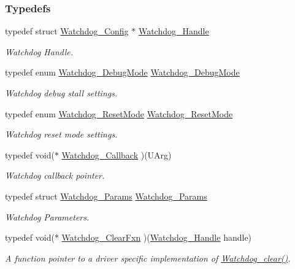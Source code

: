 \subsubsection*{Typedefs}
\begin{DoxyCompactItemize}
\item 
typedef struct \hyperlink{struct_watchdog___config}{Watchdog\-\_\-\-Config} $\ast$ \hyperlink{_watchdog_8h_a00ed22749c947ef200434eeec507f90d}{Watchdog\-\_\-\-Handle}
\begin{DoxyCompactList}\small\item\em Watchdog Handle. \end{DoxyCompactList}\item 
typedef enum \hyperlink{_watchdog_8h_ab1aa5862661c88a16b9d7bc12709d51e}{Watchdog\-\_\-\-Debug\-Mode} \hyperlink{_watchdog_8h_a369f0c40c3acb08f0ad21df99aedd42f}{Watchdog\-\_\-\-Debug\-Mode}
\begin{DoxyCompactList}\small\item\em Watchdog debug stall settings. \end{DoxyCompactList}\item 
typedef enum \hyperlink{_watchdog_8h_ada0db7216129d7dad494bb0cd0169f88}{Watchdog\-\_\-\-Reset\-Mode} \hyperlink{_watchdog_8h_a49befb9cfb12eb30c8832809bcbaa3a4}{Watchdog\-\_\-\-Reset\-Mode}
\begin{DoxyCompactList}\small\item\em Watchdog reset mode settings. \end{DoxyCompactList}\item 
typedef void($\ast$ \hyperlink{_watchdog_8h_a779c2644e40b760c2418b18f2c167479}{Watchdog\-\_\-\-Callback} )(U\-Arg)
\begin{DoxyCompactList}\small\item\em Watchdog callback pointer. \end{DoxyCompactList}\item 
typedef struct \hyperlink{struct_watchdog___params}{Watchdog\-\_\-\-Params} \hyperlink{_watchdog_8h_a001003d331ef831675e9a8388a81041c}{Watchdog\-\_\-\-Params}
\begin{DoxyCompactList}\small\item\em Watchdog Parameters. \end{DoxyCompactList}\item 
typedef void($\ast$ \hyperlink{_watchdog_8h_a23a5b26733f63039daa93378d5307a7d}{Watchdog\-\_\-\-Clear\-Fxn} )(\hyperlink{_watchdog_8h_a00ed22749c947ef200434eeec507f90d}{Watchdog\-\_\-\-Handle} handle)
\begin{DoxyCompactList}\small\item\em A function pointer to a driver specific implementation of \hyperlink{_watchdog_8h_a396decd6b1807db10c636f9987c3be4c}{Watchdog\-\_\-clear()}. \end{DoxyCompactList}\item 

\end{DoxyCompactItemize}
